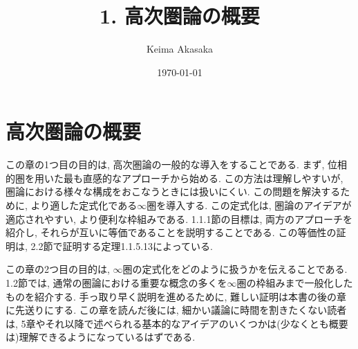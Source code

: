 \documentclass[uplatex, a4paper, 14Q, dvipdfmx]{jsreport}
\title{1. 高次圏論の概要}
\author{Keima Akasaka}
\date{\today}
\begin{document}
\maketitle

\chapter{高次圏論の概要}

この章の1つ目の目的は, 高次圏論の一般的な導入をすることである. 
まず, 位相的圏を用いた最も直感的なアプローチから始める. 
この方法は理解しやすいが, 圏論における様々な構成をおこなうときには扱いにくい. 
この問題を解決するために, より適した定式化である$\infty$圏を導入する. 
この定式化は, 圏論のアイデアが適応されやすい, より便利な枠組みである. 
1.1.1節の目標は, 両方のアプローチを紹介し, それらが互いに等価であることを説明することである. 
この等価性の証明は, 2.2節で証明する定理1.1.5.13によっている. 

この章の2つ目の目的は, $\infty$圏の定式化をどのように扱うかを伝えることである. 
1.2節では, 通常の圏論における重要な概念の多くを$\infty$圏の枠組みまで一般化したものを紹介する.
手っ取り早く説明を進めるために, 難しい証明は本書の後の章に先送りにする. 
この章を読んだ後には, 細かい議論に時間を割きたくない読者は, 5章やそれ以降で述べられる基本的なアイデアのいくつかは(少なくとも概要は)理解できるようになっているはずである. 
\end{document}
